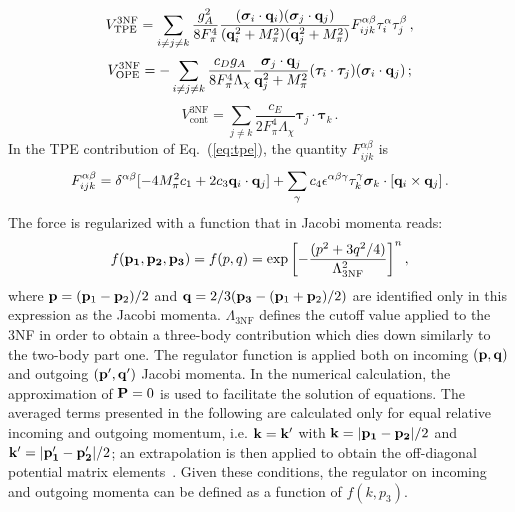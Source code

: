 \begin{equation}
V^\mathrm{3NF}_\mathrm{TPE} =\sum_{i\neq j\neq k}  \frac{g_A^2}{8F_\pi^4}
\frac{(\boldsymbol\sigma_i\cdot{\bf q}_i)(\boldsymbol\sigma_j\cdot{\bf q}_j)}{({\bf q}_i^2 + M_\pi^2)
({\bf q}_j^2 + M_\pi^2)}
F_{ijk}^{\alpha\beta}\tau_i^{\alpha}\tau_j^{\beta}\,,
\label{eq:tpe}
\end{equation}
\begin{equation}
V^\mathrm{3NF}_\mathrm{OPE} = -\sum_{i\neq j\neq k} \frac{c_D g_A}{8F_\pi^4\Lambda_\chi}
\frac{\boldsymbol\sigma_j\cdot{\bf q}_j}{{\bf q}_j^2 + M_\pi^2}(\boldsymbol\tau_i\cdot\boldsymbol\tau_j)
(\boldsymbol\sigma_i\cdot{\bf q}_j)\,;
\label{eq:ope}
\end{equation}
\begin{equation}
V^\mathrm{3NF}_\mathrm{cont} =  \sum_{j\neq k} \frac{c_E}{2F_\pi^4\Lambda_\chi}
\boldsymbol\tau_j \cdot \boldsymbol\tau_k \,.
\label{eq:cont}
\end{equation}
In the TPE contribution of Eq.~(\ref{eq:tpe}), the quantity $F_{ijk}^{\alpha\beta}$ is
\begin{equation}
F_{ijk}^{\alpha\beta}=\delta^{\alpha\beta} [-4M_\pi^2c_1+2 c_3{\bf q}_i\cdot{\bf q}_j]
+\sum_\gamma c_4\epsilon^{\alpha\beta\gamma}\tau^\gamma_k\boldsymbol\sigma_k\cdot[{\bf q}_i\times{\bf q}_j]\,.
\label{eq:tpe_tensor}
\end{equation}
The force is regularized with a function that in Jacobi momenta reads:
\begin{equation}
\label{eq:regulator}
f({\bf p_1},{\bf p_2},{\bf p_3})=f(p,q)=\exp{\left[-\frac{(p^2+3q^2/4)}{\Lambda^2_\textrm{3NF}}\right]^n}\,,
\end{equation}
where ${\bf p}=({\bf p}_1-{\bf p}_2)/2$ and ${\bf q}=2/3({\bf p_3}-({\bf p}_1+{\bf p}_2)/2)$ are identified only in this expression as the Jacobi momenta. $\Lambda_\textrm{3NF}$ defines the cutoff value applied to the 3NF in order to obtain a three-body contribution which dies down similarly to the two-body part one. The regulator function is applied both on incoming $({\bf p},{\bf q})$ and outgoing $({\bf p'},{\bf q'})$ Jacobi momenta. In the numerical calculation, the approximation of ${\bf P}=0$ is used to facilitate the solution of equations. The averaged terms presented in the following are calculated only for equal relative incoming and outgoing momentum, i.e. ${\bf k}={\bf k'}$ with ${\bf k}=|{\bf p_1}-{\bf p_2}|/2$ and ${\bf k'}=|{\bf p'_1}-{\bf p'_2}|/2$; an extrapolation is then applied to obtain the off-diagonal potential matrix elements~\cite{ch11_Carbone2014}. Given these conditions, the regulator on incoming and outgoing momenta can be defined as a function of $f(k,p_3)$.\\

